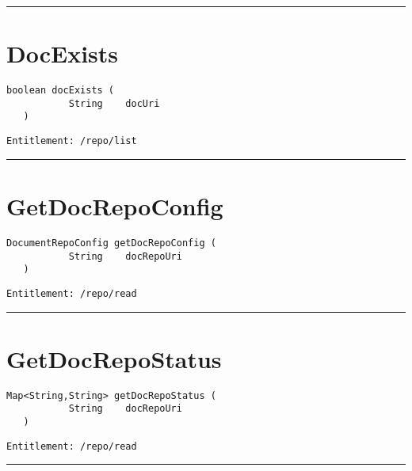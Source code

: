 \rule{12cm}{2pt}
\section{DocExists}
\label{Api:DocExists}
\begin{lstlisting}[style=nonumbers]
   boolean docExists (
           String    docUri
   )
\end{lstlisting}
\begin{Verbatim}[formatcom=\color{Maroon}]
  Entitlement: /repo/list
\end{Verbatim}



\rule{12cm}{2pt}
\section{GetDocRepoConfig}
\label{Api:GetDocRepoConfig}
\begin{lstlisting}[style=nonumbers]
   DocumentRepoConfig getDocRepoConfig (
           String    docRepoUri
   )
\end{lstlisting}
\begin{Verbatim}[formatcom=\color{Maroon}]
  Entitlement: /repo/read
\end{Verbatim}



\rule{12cm}{2pt}
\section{GetDocRepoStatus}
\label{Api:GetDocRepoStatus}
\begin{lstlisting}[style=nonumbers]
   Map<String,String> getDocRepoStatus (
           String    docRepoUri
   )
\end{lstlisting}
\begin{Verbatim}[formatcom=\color{Maroon}]
  Entitlement: /repo/read
\end{Verbatim}



\rule{12cm}{2pt}
